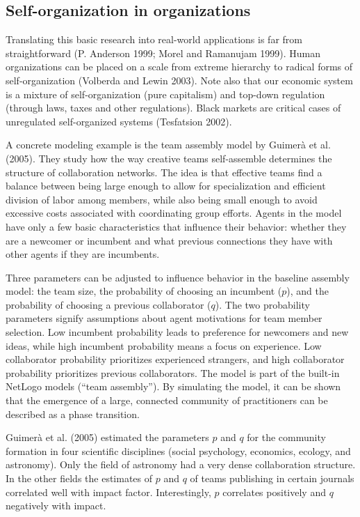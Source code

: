\documentclass[
  a4paper,
  DIV=11,
  numbers=noendperiod]{scrreprt}
\begin{document}
\hypertarget{sec-Selforganization-in-organizations}{%
\subsection{Self-organization in
organizations}\label{sec-Selforganization-in-organizations}}

Translating this basic research into real-world applications is far from
straightforward (P. Anderson 1999; Morel and Ramanujam 1999). Human
organizations can be placed on a scale from extreme hierarchy to radical
forms of self-organization (Volberda and Lewin 2003). Note also that our
economic system is a mixture of self-organization (pure capitalism) and
top-down regulation (through laws, taxes and other regulations). Black
markets are critical cases of unregulated self-organized systems
(Tesfatsion 2002).

A concrete modeling example is the team assembly model by Guimerà et al.
(2005). They study how the way creative teams self-assemble determines
the structure of collaboration networks. The idea is that effective
teams find a balance between being large enough to allow for
specialization and efficient division of labor among members, while also
being small enough to avoid excessive costs associated with coordinating
group efforts. Agents in the model have only a few basic characteristics
that influence their behavior: whether they are a newcomer or incumbent
and what previous connections they have with other agents if they are
incumbents.

Three parameters can be adjusted to influence behavior in the baseline
assembly model: the team size, the probability of choosing an incumbent
(\(p\)), and the probability of choosing a previous collaborator
(\(q\)). The two probability parameters signify assumptions about agent
motivations for team member selection. Low incumbent probability leads
to preference for newcomers and new ideas, while high incumbent
probability means a focus on experience. Low collaborator probability
prioritizes experienced strangers, and high collaborator probability
prioritizes previous collaborators. The model is part of the built-in
NetLogo models (``team assembly''). By simulating the model, it can be
shown that the emergence of a large, connected community of
practitioners can be described as a phase transition.

Guimerà et al. (2005) estimated the parameters \(p\) and \(q\) for the
community formation in four scientific disciplines (social psychology,
economics, ecology, and astronomy). Only the field of astronomy had a
very dense collaboration structure. In the other fields the estimates of
\(p\) and \(q\) of teams publishing in certain journals correlated well
with impact factor. Interestingly, \(p\) correlates positively and \(q\)
negatively with impact.
\end{document}
